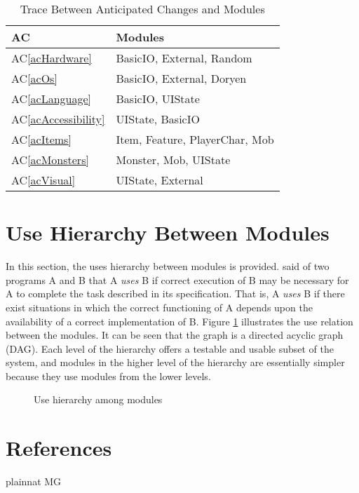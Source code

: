 \documentclass[12pt, titlepage]{article}
\newcommand{\newSection}[1]{
  \newpage
  \section{#1}
}
\newcommand{\acref}[1]{AC\ref{#1}}
\begin{document}
\begin{table}[H]
    \centering
    \begin{tabular}{p{} p{}}

        \toprule
        \textbf{AC} & \textbf{Modules}\\
        \midrule
        \acref{acHardware} & BasicIO, External, Random\\
        \acref{acOs} & BasicIO, External, Doryen\\
        \acref{acLanguage} & BasicIO, UIState\\
        \acref{acAccessibility} & UIState, BasicIO\\
        \acref{acItems} & Item, Feature, PlayerChar, Mob\\
        \acref{acMonsters} & Monster, Mob, UIState\\
        \acref{acVisual} & UIState, External\\

        \bottomrule
    \end{tabular}

    \caption{Trace Between Anticipated Changes and Modules}
    \label{TblACT}
\end{table}

\newSection{Use Hierarchy Between Modules} \label{SecUse}

    In this section, the uses hierarchy between modules is provided. \citet{Parnas1978} said of two programs A and B that A {\em uses} B if correct execution of B may be necessary for A to complete the task described in its specification. That is, A {\em uses} B if there exist situations in which the correct functioning of A depends upon the availability of a correct implementation of B.  Figure \ref{FigUH} illustrates the use relation between the modules. It can be seen that the graph is a directed acyclic graph (DAG). Each level of the hierarchy offers a testable and usable subset of the system, and modules in the higher level of the hierarchy are essentially simpler because they use modules from the lower levels.

    \begin{figure}[H]
        \centering
        \caption{Use hierarchy among modules}
        \label{FigUH}
    \end{figure}

\newSection{References} \label{SecRef}

     {plainnat}
     {MG}
\end{document}
